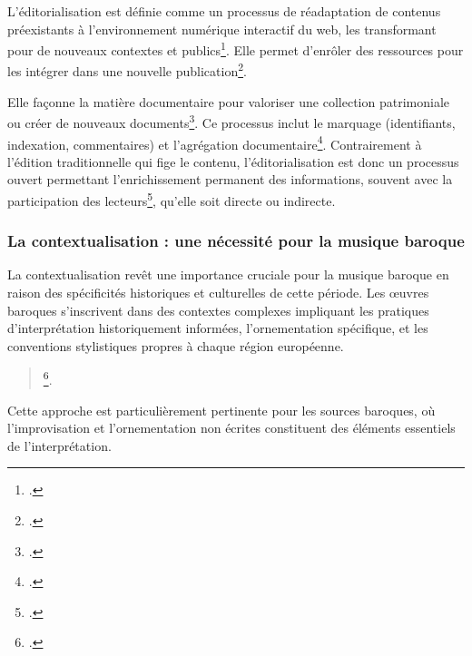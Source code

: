 L'éditorialisation est définie comme un processus de réadaptation de contenus préexistants à l'environnement numérique interactif du web, les transformant pour de nouveaux contextes et publics\footcite{chartronEditionPublicationContenus2016}. Elle permet d'enrôler des ressources pour les intégrer dans une nouvelle publication\footcite{chartronEditorialisationQuoiParleton2020}.

Elle façonne la matière documentaire pour valoriser une collection patrimoniale ou créer de nouveaux documents\footcite{schopfelEditorialisationDonneesRecherche2020}. Ce processus inclut le marquage (identifiants, indexation, commentaires) et l'agrégation documentaire\footcite{schopfelEditorialisationDonneesRecherche2020}. Contrairement à l'édition traditionnelle qui fige le contenu, l'éditorialisation est donc un processus ouvert permettant l'enrichissement permanent des informations, souvent avec la participation des lecteurs\footcite{chartronEditionPublicationContenus2016}, qu'elle soit directe ou indirecte.

\subsubsection{La contextualisation : une nécessité pour la musique baroque}

La contextualisation revêt une importance cruciale pour la musique baroque en raison des spécificités historiques et culturelles de cette période. Les œuvres baroques s'inscrivent dans des contextes complexes impliquant les pratiques d'interprétation historiquement informées, l'ornementation spécifique, et les conventions stylistiques propres à chaque région européenne.

\begin{quotation}
	\footcite[consultée le 04/08/2025]{EpistemologieMusicologieNumerique}.
\end{quotation}

Cette approche est particulièrement pertinente pour les sources baroques, où l'improvisation et l'ornementation non écrites constituent des éléments essentiels de l'interprétation.

